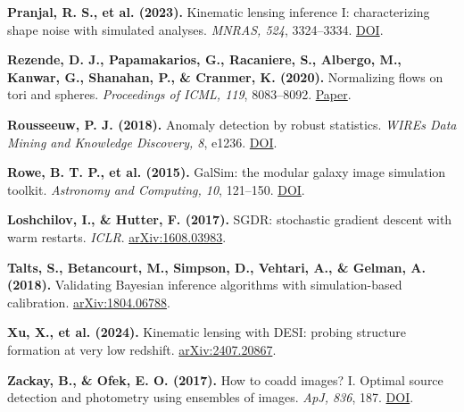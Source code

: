 \documentclass[11pt]{article}
\begin{document}
\hypertarget{ref:pranjal2023}{}%
\textbf{Pranjal, R. S., et al. (2023).} Kinematic lensing inference I: characterizing shape noise with simulated analyses. \emph{MNRAS, 524}, 3324--3334. \href{https://doi.org/10.1093/mnras/stad2014}{DOI}.\par
\hypertarget{ref:rezende2020}{}%
\textbf{Rezende, D. J., Papamakarios, G., Racaniere, S., Albergo, M., Kanwar, G., Shanahan, P., \& Cranmer, K. (2020).} Normalizing flows on tori and spheres. \emph{Proceedings of ICML, 119}, 8083--8092. \href{https://proceedings.mlr.press/v119/rezende20a.html}{Paper}.\par
\hypertarget{ref:rousseeuw2018}{}%
\textbf{Rousseeuw, P. J. (2018).} Anomaly detection by robust statistics. \emph{WIREs Data Mining and Knowledge Discovery, 8}, e1236. \href{https://doi.org/10.1002/widm.1236}{DOI}.\par
\hypertarget{ref:rowe2015}{}%
\textbf{Rowe, B. T. P., et al. (2015).} GalSim: the modular galaxy image simulation toolkit. \emph{Astronomy and Computing, 10}, 121--150. \href{https://doi.org/10.1016/j.ascom.2015.02.002}{DOI}.\par
\hypertarget{ref:sgdr}{}%
\textbf{Loshchilov, I., \& Hutter, F. (2017).} SGDR: stochastic gradient descent with warm restarts. \emph{ICLR}. \href{https://arxiv.org/abs/1608.03983}{arXiv:1608.03983}.\par
\hypertarget{ref:talts2018}{}%
\textbf{Talts, S., Betancourt, M., Simpson, D., Vehtari, A., \& Gelman, A. (2018).} Validating Bayesian inference algorithms with simulation-based calibration. \href{https://arxiv.org/abs/1804.06788}{arXiv:1804.06788}.\par
\hypertarget{ref:xu2024}{}%
\textbf{Xu, X., et al. (2024).} Kinematic lensing with DESI: probing structure formation at very low redshift. \href{https://arxiv.org/abs/2407.20867}{arXiv:2407.20867}.\par
\hypertarget{ref:zackay2017}{}%
\textbf{Zackay, B., \& Ofek, E. O. (2017).} How to coadd images? I. Optimal source detection and photometry using ensembles of images. \emph{ApJ, 836}, 187. \href{https://doi.org/10.3847/1538-4357/836/2/187}{DOI}.\par
\end{document}
